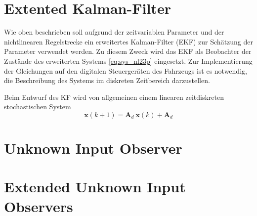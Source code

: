 \section{Extented Kalman-Filter}
Wie oben beschrieben soll aufgrund der zeitvariablen Parameter und der nichtlinearen Regelstrecke ein erweitertes Kalman-Filter (EKF) zur Schätzung der Parameter verwendet werden. Zu diesem Zweck wird das EKF als Beobachter der Zustände des erweiterten Systems \eqref{eq:sys_nl23p} eingesetzt. Zur Implementierung der Gleichungen auf den digitalen Steuergeräten des Fahrzeugs ist es notwendig, die Beschreibung des Systems im diskreten Zeitbereich darzustellen.

Beim Entwurf des KF wird von allgemeinen einem linearen zeitdiskreten stochastischen System 
\begin{equation}
\pmb{x}(k+1) = \pmb{A}_d\ \pmb{x}(k) + \pmb{A}_d
\end{equation}


\section{Unknown Input Observer}
\section{Extended Unknown Input Observers}




